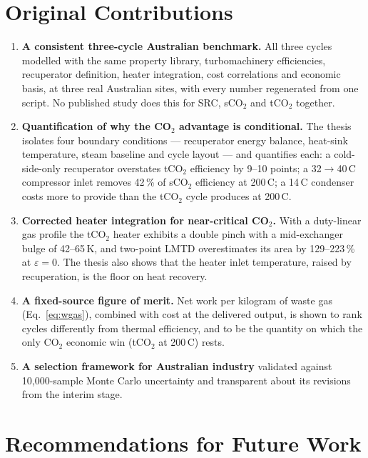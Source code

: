\documentclass[12pt,a4paper]{report}
\begin{document}
\section{Original Contributions}
\label{sec:contributions}

\begin{enumerate}[leftmargin=1.8em,itemsep=5pt]
\item \textbf{A consistent three-cycle Australian benchmark.} All three
cycles modelled with the same property library, turbomachinery efficiencies,
recuperator definition, heater integration, cost correlations and economic
basis, at three real Australian sites, with every number regenerated from one
script. No published study does this for SRC, sCO$_2$ and tCO$_2$ together.
\item \textbf{Quantification of why the CO$_2$ advantage is
conditional.} The thesis isolates four boundary conditions --- recuperator
energy balance, heat-sink temperature, steam baseline and cycle layout ---
and quantifies each: a cold-side-only recuperator overstates tCO$_2$
efficiency by 9--10 points; a 32$\to$40\,\textdegree C compressor inlet
removes 42\,\% of sCO$_2$ efficiency at 200\,\textdegree C; a 14\,\textdegree C
condenser costs more to provide than the tCO$_2$ cycle produces at
200\,\textdegree C.
\item \textbf{Corrected heater integration for near-critical CO$_2$.} With
a duty-linear gas profile the tCO$_2$ heater exhibits a double pinch with a
mid-exchanger bulge of 42--65\,K, and two-point LMTD overestimates its area
by 129--223\,\% at $\varepsilon = 0$. The thesis also shows that the heater
inlet temperature, raised by recuperation, is the floor on heat recovery.
\item \textbf{A fixed-source figure of merit.} Net work per kilogram of
waste gas (Eq.~\ref{eq:wgas}), combined with cost at the delivered output,
is shown to rank cycles differently from thermal efficiency, and to be the
quantity on which the only CO$_2$ economic win (tCO$_2$ at
200\,\textdegree C) rests.
\item \textbf{A selection framework for Australian industry} validated
against 10,000-sample Monte Carlo uncertainty and transparent about its
revisions from the interim stage.
\end{enumerate}

\section{Recommendations for Future Work}
\label{sec:future_work}
\end{document}
